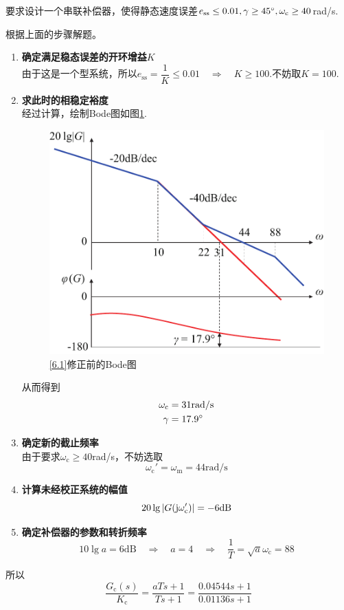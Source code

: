 要求设计一个串联补偿器，使得静态速度误差$e_{\text{ss}} \le 0.01, \gamma \ge 45{}^{\circ}, \omega_{\text{c}} \ge 40$rad/s.

\solve 根据上面的步骤解题。
\begin{enumerate}
	\item \textbf{确定满足稳态误差的开环增益$K$}\\
	由于这是一个\RMN[1]型系统，所以$e_{\text{ss}} = \dfrac{1}{K} \le 0.01 \quad \Rightarrow \quad K \ge 100$.不妨取$K = 100.$
	
	\item \textbf{求此时的相稳定裕度}\\
	经过计算，绘制Bode图如图\ref{F6.1.2}.
	\begin{figure}[!htb]
		\centering
		\includegraphics[width=0.45\linewidth]{pic/6.1.pdf}
		\vspace*{-1em}
		\caption{\ref{6.1}修正前的Bode图}
		\label{F6.1.2}
	\end{figure}

	从而得到
	\begin{align*}
		\omega_{\text{c}} &= 31 \text{rad/s}\\
		\gamma &= 17.9 {}^{\circ}
	\end{align*}
	
	\item \textbf{确定新的截止频率}\\
	由于要求$\omega_{\text{c}} \ge 40$rad/s，不妨选取
	\[
	\omega_{\text{c}}' = \omega_{\text{m}} = 44 \text{rad/s}
	\]
	
	\item \textbf{计算未经校正系统的幅值}
	\[
	20 \lg |G(\text{j} \omega_{\text{c}}')| = -6 \text{dB} 
	\]
	
	\item \textbf{确定补偿器的参数和转折频率}
	\[
	10 \lg a = 6 \text{dB} \quad \Rightarrow \quad a = 4 \quad \Rightarrow \quad \dfrac{1}{T} = \sqrt{a}\omega_{\text{c}} = 88
	\]
\end{enumerate}
所以
\[
\dfrac{G_\text{c}(s)}{K_\text{c}} = \dfrac{aTs + 1}{Ts + 1} = \dfrac{0.04544s + 1}{0.01136s + 1}
\]
